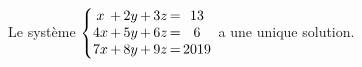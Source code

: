 Le système $\left\{ \begin{array}{@{} c @{\,}c@{\,} c @{\,}c@{\,} c @{\,}c@{\,} c @{}} x &+& 2y &+& 3z &=& 13 \\ 4x &+& 5y &+& 6z &=& 6 \\ 7x &+& 8y &+& 9z &=& 2019 \end{array} \right.$ a une unique solution.

\begin{reponses}
\end{reponses}


